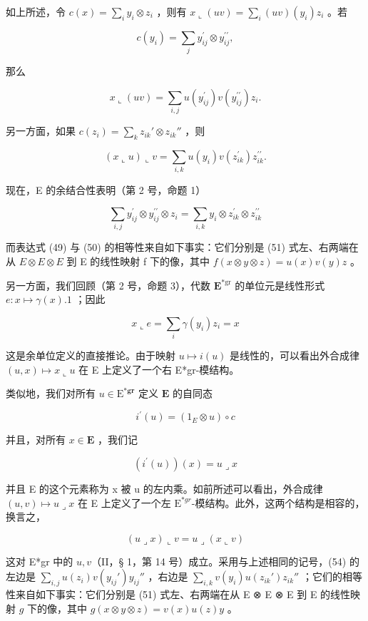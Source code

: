 如上所述，令 \(c(x) = \sum_{i} y_{i} \otimes z_{i}\) ，则有 \(x \llcorner (uv) = \sum_{i} (uv)(y_{i})z_{i}\) 。若

\[
c (y _ {i}) = \sum_ {j} y _ {i j} ^ {\prime} \otimes y _ {i j} ^ {\prime \prime},
\]

那么

\[
x \llcorner (u v) = \sum_ {i, j} u \left(y _ {i j} ^ {\prime}\right) v \left(y _ {i j} ^ {\prime \prime}\right) z _ {i}.\tag{49}
\]

另一方面，如果 \(c(z_{i}) = \sum_{k} z_{ik}' \otimes z_{ik}''\) ，则

\[
(x \llcorner u) \llcorner v = \sum_ {i, k} u (y _ {i}) v (z _ {i k} ^ {\prime}) z _ {i k} ^ {\prime \prime}.\tag{50}
\]

现在，E 的余结合性表明（第 2 号，命题 1）

\[
\sum_ {i, j} y _ {i j} ^ {\prime} \otimes y _ {i j} ^ {\prime \prime} \otimes z _ {i} = \sum_ {i, k} y _ {i} \otimes z _ {i k} ^ {\prime} \otimes z _ {i k} ^ {\prime \prime}\tag{51}
\]

而表达式 (49) 与 (50) 的相等性来自如下事实：它们分别是 (51) 式左、右两端在从 \(E \otimes E \otimes E\) 到 E 的线性映射 f 下的像，其中 \(f(x \otimes y \otimes z) = u(x)v(y)z\) 。

另一方面，我们回顾（第 2 号，命题 3），代数 \(\mathbf{E}^{*\mathrm{gr}}\) 的单位元是线性形式 \(e: x \mapsto \gamma(x).1\) ；因此

\[
x \llcorner e = \sum_ {i} \gamma (y _ {i}) z _ {i} = x
\]

这是余单位定义的直接推论。由于映射 \(u \mapsto i(u)\) 是线性的，可以看出外合成律 \((u, x) \mapsto x \llcorner u\) 在 E 上定义了一个右 E*gr-模结构。

类似地，我们对所有 \(u \in \mathrm{E}^{*\mathbf{g}\mathbf{r}}\) 定义 \(\mathbf{E}\) 的自同态

\[
i ^ {\prime} (u) = \left(1 _ {E} \otimes u\right) \circ c\tag{52}
\]

并且，对所有 \(x \in \mathbf{E}\) ，我们记

\[
\left(i ^ {\prime} (u)\right) (x) = u \lrcorner x\tag{53}
\]

并且 E 的这个元素称为 x 被 u 的左内乘。如前所述可以看出，外合成律 \((u, v) \mapsto u \lrcorner x\) 在 E 上定义了一个左 \(\mathrm{E}^{*gr}\)-模结构。此外，这两个结构是相容的，换言之，

\[
(u \lrcorner x) \llcorner v = u \lrcorner (x \llcorner v)\tag{54}
\]

这对 E*gr 中的 \(u, v\)（II，§ 1，第 14 号）成立。采用与上述相同的记号，(54) 的左边是 \(\sum_{i,j} u(z_i) v(y_{ij}') y_{ij}''\) ，右边是 \(\sum_{i,k} v(y_i) u(z_{ik}') z_{ik}''\) ；它们的相等性来自如下事实：它们分别是 (51) 式左、右两端在从 E ⊗ E ⊗ E 到 E 的线性映射 \(g\) 下的像，其中 \(g(x \otimes y \otimes z) = v(x) u(z)y\) 。

